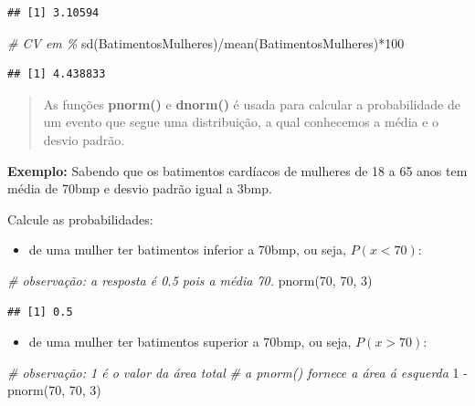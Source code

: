 \documentclass[
]{book}
\newenvironment{Shaded}{\begin{snugshade}}{\end{snugshade}}
\newcommand{\CommentTok}[1]{\textcolor[rgb]{0.56,0.35,0.01}{\textit{#1}}}
\newcommand{\DecValTok}[1]{\textcolor[rgb]{0.00,0.00,0.81}{#1}}
\newcommand{\FunctionTok}[1]{\textcolor[rgb]{0.00,0.00,0.00}{#1}}
\newcommand{\NormalTok}[1]{#1}
\newcommand{\SpecialCharTok}[1]{\textcolor[rgb]{0.00,0.00,0.00}{#1}}
\providecommand{\tightlist}{%
  \setlength{\itemsep}{0pt}\setlength{\parskip}{0pt}}
\begin{document}
\begin{verbatim}
## [1] 3.10594
\end{verbatim}

\begin{Shaded}
\begin{Highlighting}[]
\CommentTok{\# CV em \%}
\FunctionTok{sd}\NormalTok{(BatimentosMulheres)}\SpecialCharTok{/}\FunctionTok{mean}\NormalTok{(BatimentosMulheres)}\SpecialCharTok{*}\DecValTok{100}
\end{Highlighting}
\end{Shaded}

\begin{verbatim}
## [1] 4.438833
\end{verbatim}

\begin{quote}
As funções \textbf{pnorm()} e \textbf{dnorm()} é usada para calcular a probabilidade de um evento que segue uma distribuição, a qual conhecemos a média e o desvio padrão.
\end{quote}

\textbf{Exemplo:} Sabendo que os batimentos cardíacos de mulheres de 18 a 65 anos tem média de 70bmp e desvio padrão igual a 3bmp.

Calcule as probabilidades:

\begin{itemize}
\tightlist
\item
  de uma mulher ter batimentos inferior a 70bmp, ou seja, \(P(x<70)\):
\end{itemize}

\begin{Shaded}
\begin{Highlighting}[]
\CommentTok{\# observação: a resposta é 0.5 pois a média 70.}
\FunctionTok{pnorm}\NormalTok{(}\DecValTok{70}\NormalTok{, }\DecValTok{70}\NormalTok{, }\DecValTok{3}\NormalTok{)}
\end{Highlighting}
\end{Shaded}

\begin{verbatim}
## [1] 0.5
\end{verbatim}

\begin{itemize}
\tightlist
\item
  de uma mulher ter batimentos superior a 70bmp, ou seja, \(P(x>70)\):
\end{itemize}

\begin{Shaded}
\begin{Highlighting}[]
\CommentTok{\# observação: 1 é o valor da área total}
\CommentTok{\# a pnorm() fornece a área á esquerda}
\DecValTok{1} \SpecialCharTok{{-}} \FunctionTok{pnorm}\NormalTok{(}\DecValTok{70}\NormalTok{, }\DecValTok{70}\NormalTok{, }\DecValTok{3}\NormalTok{)}
\end{Highlighting}
\end{Shaded}
\end{document}
